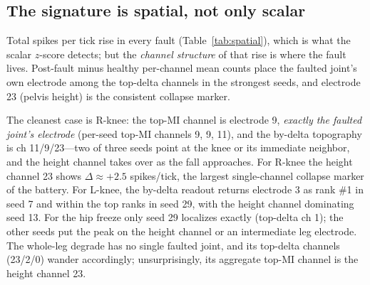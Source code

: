 \subsection{The signature is spatial, not only scalar}

Total spikes per tick rise in every fault (Table~\ref{tab:spatial}), which is
what the scalar $z$-score detects; but the \emph{channel structure} of that
rise is where the fault lives. Post-fault minus healthy per-channel mean counts
place the faulted joint's own electrode among the top-delta channels in the
strongest seeds, and electrode 23 (pelvis height) is the consistent collapse
marker.

\begin{table}[t]
\caption{Rate shift and topographic localization. ``total pre$\rightarrow$post''
is the mean total spikes per tick before and after the fault; ``MI top ch'' is
the mean top-channel MI over seeds with its aggregate channel; ``exact joint
hit'' describes the strongest seeds' top-delta localization against the faulted
electrode.}
\label{tab:spatial}
\centering
\small
\renewcommand{\arraystretch}{1.15}
\end{table}

The cleanest case is R-knee: the top-MI channel is electrode 9, \emph{exactly
the faulted joint's electrode} (per-seed top-MI channels 9, 9, 11), and the
by-delta topography is ch 11/9/23---two of three seeds point at the knee or its
immediate neighbor, and the height channel takes over as the fall approaches.
For R-knee the height channel 23 shows $\Delta \approx +2.5$ spikes/tick, the
largest single-channel collapse marker of the battery. For L-knee, the
by-delta readout returns electrode 3 as rank \#1 in seed 7 and within the top
ranks in seed 29, with the height channel dominating seed 13. For the hip
freeze only seed 29 localizes exactly (top-delta ch 1); the other seeds put the
peak on the height channel or an intermediate leg electrode. The whole-leg
degrade has no single faulted joint, and its top-delta channels (23/2/0) wander
accordingly; unsurprisingly, its aggregate top-MI channel is the height channel
23.

